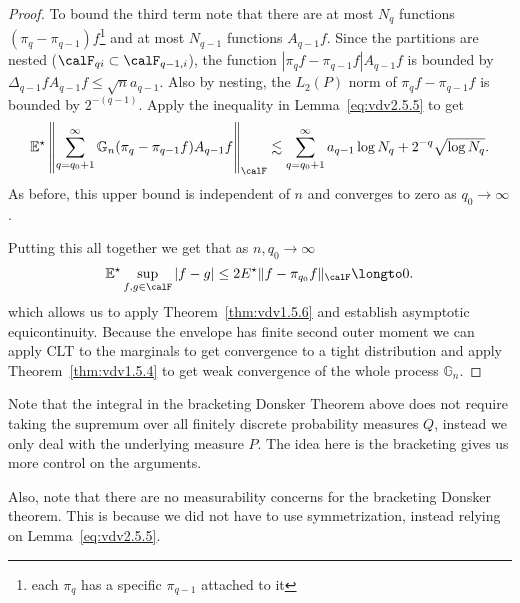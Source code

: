 \begin{proof}
	To bound the third term note that there are at most \(N_q\) functions \((\pi_q-\pi_{q-1})f\)\footnote{each \(\pi_q\) has a specific \(\pi_{q-1}\) attached to it} and at most \(N_{q-1}\) functions \(A_{q-1}f\). Since the partitions are nested (\(\calF_{qi}\subset\calF_{q-1,i}\)), the function \(|\pi_qf-\pi_{q-1}f|A_{q-1}f\) is bounded by \(\Delta_{q-1}fA_{q-1}f\leq \sqrt{n}a_{q-1}\). Also by nesting, the \(L_2(P)\) norm of \(\pi_qf-\pi_{q-1}f\) is bounded by \(2^{-(q-1)}\). Apply the inequality in Lemma~\ref{eq:vdv2.5.5} to get
	\[
		\E^\star\left\|\sum_{q=q_0+1}^\infty \mathbb{G}_n(\pi_q-\pi_{q-1}f)A_{q-1}f\right\|_\calF \lesssim \sum_{q=q_0+1}^\infty a_{q-1}\log N_q + 2^{-q}\sqrt{\log N_q} 
	.\] 
	As before, this upper bound is independent of \(n\) and converges to zero as \(q_0\to\infty\).

	Putting this all together we get that as \(n,q_0\to\infty\) 
	\[
		\E^\star\sup_{f,g\in\calF}|f-g| \leq 2E^\star \|f-\pi_{q_0}f\|_\calF\longto 0
	.\]
	which allows us to apply Theorem~\ref{thm:vdv1.5.6} and establish asymptotic equicontinuity. Because the envelope has finite second outer moment we can apply CLT to the marginals to get convergence to a tight distribution and apply Theorem~\ref{thm:vdv1.5.4} to get weak convergence of the whole process \(\mathbb{G}_n\).
\end{proof}
\begin{remark*}
	Note that the integral in the bracketing Donsker Theorem above does not require taking the supremum over all finitely discrete probability measures \(Q\), instead we only deal with the underlying measure \(P\). The idea here is the bracketing gives us more control on the arguments. 

	Also, note that there are no measurability concerns for the bracketing Donsker theorem. This is because we did not have to use symmetrization, instead relying on Lemma~\ref{eq:vdv2.5.5}.
\end{remark*}
